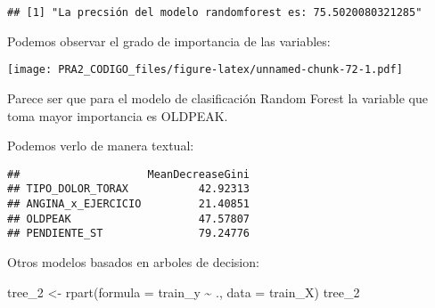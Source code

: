 \documentclass[
]{article}
\newenvironment{Shaded}{\begin{snugshade}}{\end{snugshade}}
\newcommand{\AttributeTok}[1]{\textcolor[rgb]{0.80,0.80,0.80}{#1}}
\newcommand{\FunctionTok}[1]{\textcolor[rgb]{0.94,0.94,0.56}{#1}}
\newcommand{\NormalTok}[1]{\textcolor[rgb]{0.80,0.80,0.80}{#1}}
\newcommand{\OtherTok}[1]{\textcolor[rgb]{0.94,0.94,0.56}{#1}}
\newcommand{\SpecialCharTok}[1]{\textcolor[rgb]{0.86,0.64,0.64}{#1}}
\newcommand{\StringTok}[1]{\textcolor[rgb]{0.80,0.58,0.58}{#1}}
\begin{document}
\begin{verbatim}
## [1] "La precsión del modelo randomforest es: 75.5020080321285"
\end{verbatim}

Podemos observar el grado de importancia de las variables:

\begin{Shaded}
\end{Shaded}

\texttt{[image: PRA2\_CODIGO\_files/figure-latex/unnamed-chunk-72-1.pdf]}

Parece ser que para el modelo de clasificación Random Forest la variable
que toma mayor importancia es OLDPEAK.

Podemos verlo de manera textual:

\begin{Shaded}
\end{Shaded}

\begin{verbatim}
##                    MeanDecreaseGini
## TIPO_DOLOR_TORAX           42.92313
## ANGINA_x_EJERCICIO         21.40851
## OLDPEAK                    47.57807
## PENDIENTE_ST               79.24776
\end{verbatim}

Otros modelos basados en arboles de decision:

\begin{Shaded}
\begin{Highlighting}[]
\NormalTok{tree\_2 }\OtherTok{\textless{}{-}} \FunctionTok{rpart}\NormalTok{(}\AttributeTok{formula =}\NormalTok{ train\_y }\SpecialCharTok{\textasciitilde{}}\NormalTok{ ., }\AttributeTok{data =}\NormalTok{ train\_X)}
\NormalTok{tree\_2}
\end{Highlighting}
\end{Shaded}
\end{document}
